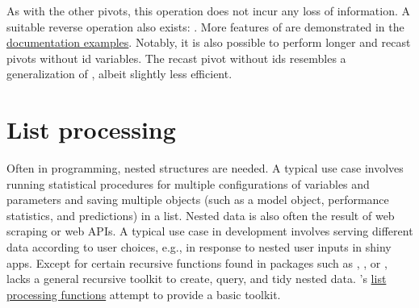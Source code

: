 \documentclass[nojss]{jss} %
\newcommand{\fct}[1]{\code{#1()}}
\begin{document}
%
As with the other pivots, this operation does not incur any loss of information. A suitable reverse operation also exists: . More features of \fct{pivot} are demonstrated in the \href{https://sebkrantz.github.io/collapse/reference/pivot.html#ref-examples}{documentation examples}. Notably, it is also possible to perform longer and recast pivots without id variables. The recast pivot without ids resembles a generalization of , albeit slightly less efficient.
%
\section{List processing} \label{sec:list_proc}
%
Often in programming, nested structures are needed. A typical use case involves running statistical procedures for multiple configurations of variables and parameters and saving multiple objects (such as a model object, performance statistics, and predictions) in a list. Nested data is also often the result of web scraping or web APIs. A typical use case in development involves serving different data according to user choices, e.g., in response to nested user inputs in shiny apps. Except for certain recursive functions found in packages such as , , or ,  lacks a general recursive toolkit to create, query, and tidy nested data. 's \href{https://sebkrantz.github.io/collapse/reference/list-processing.html}{list processing functions} attempt to provide a basic toolkit. \newline
\end{document}
